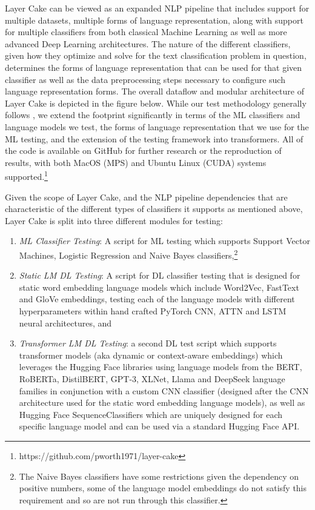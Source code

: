 \documentclass[final]{clv2025}
\begin{document}
Layer Cake can be viewed as an expanded NLP pipeline that includes support for multiple datasets, multiple forms of language representation, along with support for multiple classifiers from both classical Machine Learning as well as more advanced Deep Learning architectures. The nature of the different classifiers, given how they optimize and solve for the text classification problem in question, determines the forms of language representation that can be used for that given classifier as well as the data preprocessing steps necessary to configure such language representation forms. The overall dataflow and modular architecture of Layer Cake is depicted in the figure below. While our test methodology generally follows \cite{moreo2021}, we extend the footprint significantly in terms of the ML classifiers and language models we test, the forms of language representation that we use for the ML testing, and the extension of the testing framework into transformers. All of the code is available on GitHub for further research or the reproduction of results, with both MacOS (MPS) and Ubuntu Linux (CUDA) systems supported.\footnote{https://github.com/pworth1971/layer-cake}

Given the scope of Layer Cake, and the NLP pipeline dependencies that are characteristic of the different types of classifiers it supports as mentioned above, Layer Cake is split into three different modules for testing:
\begin{enumerate}
    \item \textit{ML Classifier Testing}: A script for ML testing which supports Support Vector Machines, Logistic Regression and Naive Bayes classifiers,\footnote{The Naive Bayes classifiers have some restrictions given the dependency on positive numbers, some of the language model embeddings do not satisfy this requirement and so are not run through this classifier.}
    \item \textit{Static LM DL Testing}: A script for DL classifier testing that is designed for static word embedding language models which include Word2Vec, FastText and GloVe embeddings, testing each of the language models with different hyperparameters within hand crafted PyTorch CNN, ATTN and LSTM neural architectures, and
    \item \textit{Transformer LM DL Testing}: a second DL test script which supports transformer models (aka dynamic or context-aware embeddings) which leverages the Hugging Face libraries using language models from the BERT, RoBERTa, DistilBERT, GPT-3, XLNet, Llama and DeepSeek language families in conjunction with a custom CNN classifier (designed after the CNN architecture used for the static word embedding language models), as well as Hugging Face SequenceClassifiers which are uniquely designed for each specific language model and can be used via a standard Hugging Face API.
\end{enumerate}
\end{document}
